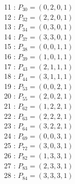 \documentclass{article}
\begin{document}
{\begin{multicols}{3}
11 : $P_{30}=( 0, 2, 0, 1 )$\\
12 : $P_{32}=( 2, 2, 0, 1 )$\\
13 : $P_{34}=( 0, 3, 0, 1 )$\\
14 : $P_{37}=( 3, 3, 0, 1 )$\\
15 : $P_{38}=( 0, 0, 1, 1 )$\\
16 : $P_{39}=( 1, 0, 1, 1 )$\\
17 : $P_{43}=( 2, 1, 1, 1 )$\\
18 : $P_{44}=( 3, 1, 1, 1 )$\\
19 : $P_{53}=( 0, 0, 2, 1 )$\\
20 : $P_{55}=( 2, 0, 2, 1 )$\\
21 : $P_{62}=( 1, 2, 2, 1 )$\\
22 : $P_{63}=( 2, 2, 2, 1 )$\\
23 : $P_{64}=( 3, 2, 2, 1 )$\\
24 : $P_{69}=( 0, 0, 3, 1 )$\\
25 : $P_{72}=( 3, 0, 3, 1 )$\\
26 : $P_{82}=( 1, 3, 3, 1 )$\\
27 : $P_{83}=( 2, 3, 3, 1 )$\\
28 : $P_{84}=( 3, 3, 3, 1 )$\\
\end{multicols}


%


%


}%
\end{document}

